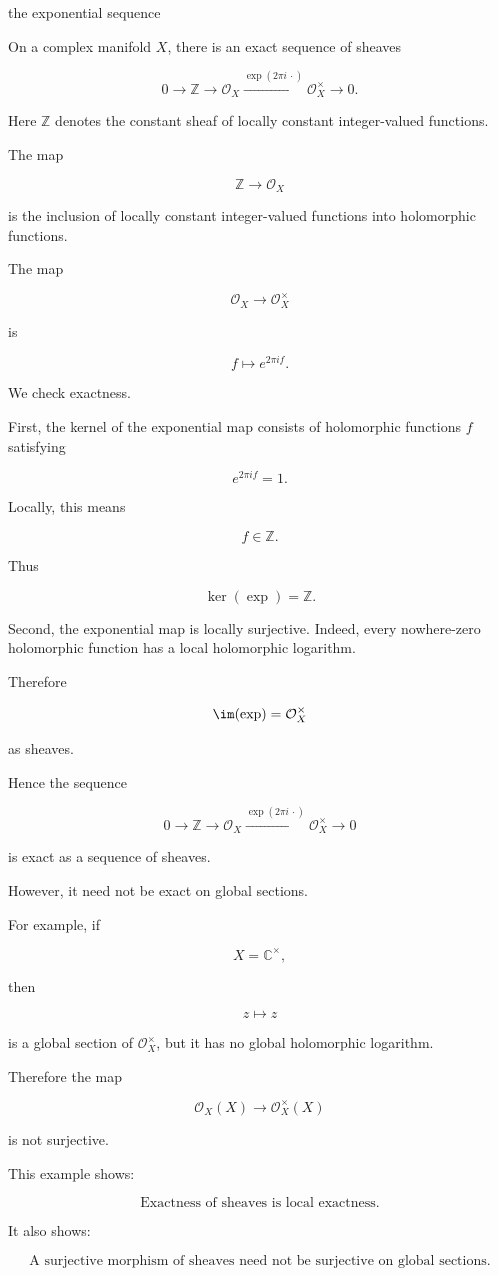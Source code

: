 \begin{problem}[CP-IV-0012]
\label{prob:cp-iv-0012}
the exponential sequence

On a complex manifold $X$, there is an exact sequence of sheaves

	\[
	0
	\longrightarrow
	\mathbb Z
	\longrightarrow
	\mathcal O_X
	\xrightarrow{\exp(2\pi i\,\cdot)}
	\mathcal O_X^\times
	\longrightarrow
	0.
	\]

	Here $\mathbb Z$ denotes the constant sheaf of locally constant integer-valued
	functions.

	The map

	\[
	\mathbb Z\to \mathcal O_X
	\]

	is the inclusion of locally constant integer-valued functions into holomorphic
	functions.

	The map

	\[
	\mathcal O_X\to \mathcal O_X^\times
	\]

	is

	\[
	f\mapsto e^{2\pi i f}.
	\]

	We check exactness.

	First, the kernel of the exponential map consists of holomorphic functions
	$f$ satisfying

	\[
	e^{2\pi i f}=1.
	\]

	Locally, this means

	\[
	f\in \mathbb Z.
	\]

	Thus

	\[
	\ker(\exp)=\mathbb Z.
	\]

	Second, the exponential map is locally surjective. Indeed, every nowhere-zero
	holomorphic function has a local holomorphic logarithm.

	Therefore

	\[
	\im(\exp)=\mathcal O_X^\times
	\]

	as sheaves.

	Hence the sequence

	\[
	0
	\longrightarrow
	\mathbb Z
	\longrightarrow
	\mathcal O_X
	\xrightarrow{\exp(2\pi i\,\cdot)}
	\mathcal O_X^\times
	\longrightarrow
	0
	\]

	is exact as a sequence of sheaves.

	However, it need not be exact on global sections.

	For example, if

	\[
	X=\mathbb C^\times,
	\]

	then

	\[
	z\mapsto z
	\]

	is a global section of $\mathcal O_X^\times$, but it has no global holomorphic
	logarithm.

	Therefore the map

	\[
	\mathcal O_X(X)\to \mathcal O_X^\times(X)
	\]

	is not surjective.

	This example shows:

	\[
	\boxed{
		\text{Exactness of sheaves is local exactness.}}
\]

	It also shows:

	\[
	\boxed{
		\text{A surjective morphism of sheaves need not be surjective on global sections.}
	}\]
\end{problem}

